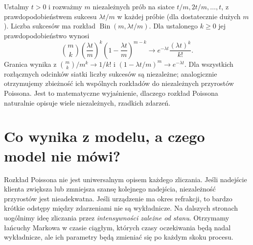 \begin{przyklad}
Ustalmy $t>0$ i rozważmy $m$ niezależnych prób
na siatce $t/m,2t/m,\ldots,t$, z prawdopodobieństwem
sukcesu $\lambda t/m$ w każdej próbie (dla dostatecznie
dużych $m$). Liczba sukcesów ma rozkład
$\operatorname{Bin}(m,\lambda t/m)$.
Dla ustalonego $k\ge0$ jej prawdopodobieństwo wynosi
\[
\binom mk\left(\frac{\lambda t}{m}\right)^k
\left(1-\frac{\lambda t}{m}\right)^{m-k}
\longrightarrow e^{-\lambda t}\frac{(\lambda t)^k}{k!}.
\]
Granica wynika z
$\binom mk/m^k\to1/k!$ i
$(1-\lambda t/m)^m\to e^{-\lambda t}$.
Dla wszystkich rozłącznych odcinków siatki liczby
sukcesów są niezależne; analogicznie otrzymujemy
zbieżność ich wspólnych rozkładów do niezależnych
przyrostów Poissona. Jest to matematyczne wyjaśnienie,
dlaczego rozkład Poissona naturalnie opisuje wiele
niezależnych, rzadkich zdarzeń.
\end{przyklad}

\section{Co wynika z modelu, a czego model nie mówi?}
Rozkład Poissona nie jest uniwersalnym opisem każdego
zliczania. Jeśli nadejście klienta zwiększa lub zmniejsza
szansę kolejnego nadejścia, niezależność przyrostów jest
nieadekwatna. Jeśli urządzenie ma okres refrakcji, to
bardzo krótkie odstępy między zdarzeniami nie są wykładnicze.
Na dalszych stronach uogólnimy ideę zliczania przez
\emph{intensywności zależne od stanu}. Otrzymamy łańcuchy
Markowa w czasie ciągłym, których czasy oczekiwania będą
nadal wykładnicze, ale ich parametry będą zmieniać się
po każdym skoku procesu.
